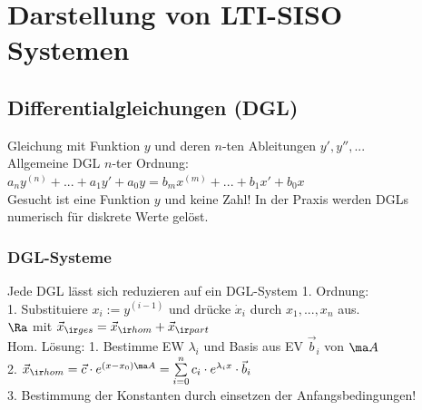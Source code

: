 \documentclass[german]{latex4ei/latex4ei_sheet}
\begin{document}
\section{Darstellung von LTI-SISO Systemen}

\begin{sectionbox}
	\subsection{Differentialgleichungen (DGL)}
	Gleichung mit Funktion $y$ und deren $n$-ten Ableitungen $y',y'',...$\\
	Allgemeine DGL $n$-ter Ordnung:\\
	$\displaystyle a_n y^{(n)} + ... + a_1 y' + a_0 y = b_m x^{(m)} + ... + b_1 x' + b_0 x$\\
	Gesucht ist eine Funktion $y$ und keine Zahl! In der Praxis werden DGLs numerisch für diskrete Werte gelöst.


	\subsubsection{DGL-Systeme}
	Jede DGL lässt sich reduzieren auf ein DGL-System 1. Ordnung:\\
	1. Substituiere $x_i := y^{(i-1)}$ und drücke $\dot x_i$ durch $x_1,...,x_n$ aus.\\
	$\Ra$  \quad mit $\vec x_{\ir ges} = \vec x_{\ir hom} + \vec x_{\ir part}$\\
	Hom. Lösung: 1. Bestimme EW $\lambda_i$ und Basis aus EV $\vec b_i$ von $\ma A$\\
	2. $\vec x_{\ir hom} = \vec c \cdot e^{(x-x_0)\ma A} = \sum\limits_{i = 0}^n c_i \cdot e^{\lambda_i x} \cdot \vec b_i$\\
	3. Bestimmung der Konstanten durch einsetzen der Anfangsbedingungen!\
\end{sectionbox}
\end{document}
